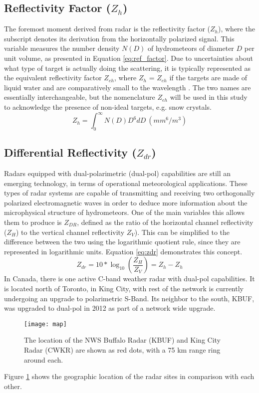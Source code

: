 \subsection{Reflectivity Factor ($Z_{h}$)}
The foremost moment derived from radar is the reflectivity factor ($Z_{h}$), where the
subscript denotes its derivation from the horizontally polarized signal. This variable
measures the number density $N(D)$ of hydrometeors of diameter $D$ per unit volume, as
presented in Equation \ref{eq:ref_factor}. Due to uncertainties about what type of
target is actually doing the scattering, it is typically represented as the equivalent
reflectivity factor $Z_{eh}$, where $Z_{h}$ = $Z_{eh}$ if the targets are made of liquid 
water and are comparatively small to the wavelength \citep{Fabry2015}. The two names are 
essentially interchangeable, but the nomenclature $Z_{eh}$ will be used in this study to 
acknowledge the presence of non-ideal targets, e.g. snow crystals.
\begin{equation}\label{eq:ref_factor}
Z_{h} = \int_0^{\infty} N(D)D^6dD \ (mm^6/m^3)
\end{equation}
\subsection{Differential Reflectivity ($Z_{dr}$)}
Radars equipped with dual-polarimetric (dual-pol) capabilities are still an emerging technology, in terms of operational meteorological applications. These types of radar systems are capable of transmitting and receiving two orthogonally polarized electromagnetic waves in order to deduce more information about the microphysical structure of hydrometeors. One of the main variables this allows them to produce is $Z_{DR}$, defined as the ratio of the horizontal channel reflectivity ($Z_H$) to the vertical channel reflectivity $Z_{V}$). This can be simplified to the difference between the two using the logarithmic quotient rule, since they are represented in logarithmic units. Equation \ref{eq:zdr} demonstrates this concept.
\begin{equation}\label{eq:zdr}
Z_{dr} = 10 * \log_{10}(\frac{Z_H}{Z_V}) = Z_h - Z_h
\end{equation}
In Canada, there is one active C-band weather radar with dual-pol capabilities. It is located north of Toronto, in King City, with rest of the network is currently undergoing an upgrade to polarimetric S-Band. Its neighbor to the south, KBUF, was upgraded to dual-pol in 2012 as part of a network wide upgrade. 
\begin{figure}[h]
\texttt{[image: map]}
\caption{The location of the NWS Buffalo Radar (KBUF) and King City Radar (CWKR) are shown as red dots, with a 75 km range ring around each.} 
\label{map}
\end{figure}
Figure \ref{map} shows the geographic location of the radar sites in comparison with each other.

 



